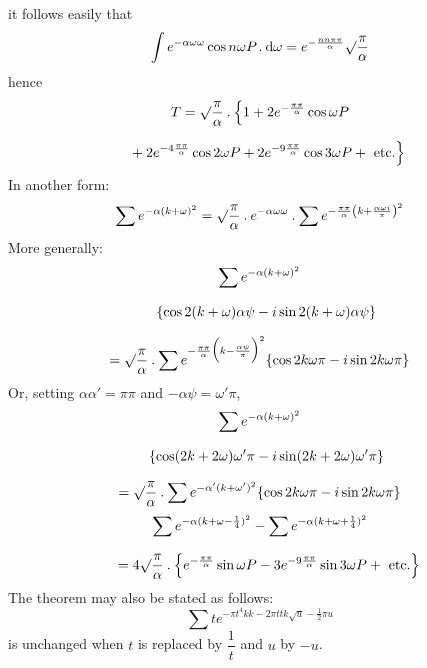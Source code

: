 it follows easily that
\[
\int e^{-\alpha\omega\omega}\cos n\omega P\mathbin{.}\mathrm{d}\omega
=e^{-\frac{nn\pi\pi}{\alpha}}\surd\frac{\pi}{\alpha}
\]
hence
\[
\begin{gathered}T=\surd\frac{\pi}{\alpha}\mathbin{.}
\Bigl\{1+2e^{-\frac{\pi\pi}{\alpha}}\cos\omega P
\\[7pt]\quad{}+2e^{-4\frac{\pi\pi}{\alpha}}\cos2\omega P
+2e^{-9\frac{\pi\pi}{\alpha}}\cos3\omega P+\text{ etc.}\Bigr\}\end{gathered}
\]
In another form:
\[
\sum e^{-\alpha(k+\omega)^2}
=\surd\frac{\pi}{\alpha}\mathbin{.}e^{-\alpha\omega\omega}\mathbin{.}
\sum e^{-\frac{\pi\pi}{\alpha}\left(k+\frac{\alpha\omega i}{\pi}\right)^2}
\]
More generally:
\[
\begin{gathered}
\sum e^{-\alpha(k+\omega)^2}\\[7pt]\quad{}\{\cos2(k+\omega)\alpha\psi-i\sin2(k+\omega)\alpha\psi\}\\[7pt]
=\surd\frac{\pi}{\alpha}\mathbin{.}
\sum e^{-\frac{\pi\pi}{\alpha}\Bigl(k-\frac{\alpha\psi}{\pi}\Bigr)^2}
\{\cos2k\omega\pi-i\sin2k\omega\pi\}
\end{gathered}
\]
Or, setting $\alpha\alpha'=\pi\pi$ and $-\alpha\psi=\omega'\pi$,
\[
\begin{gathered}
\sum e^{-\alpha(k+\omega)^2}\\[7pt]\quad{}\{\cos(2k+2\omega)\omega'\pi-i\sin(2k+2\omega)\omega'\pi\}\\[7pt]
=\surd\frac{\pi}{\alpha}\mathbin{.}\sum e^{-\alpha'(k+\omega')^2}
\{\cos2k\omega\pi-i\sin2k\omega\pi\}
\end{gathered}
\]
\[
\begin{gathered}\sum e^{-\alpha(k+\omega-\frac14)^2}-\sum e^{-\alpha(k+\omega+\frac14)^2}
\\[7pt]\quad{}=4\surd\frac{\pi}{\alpha}\mathbin{.}
\Bigl\{e^{-\frac{\pi\pi}{\alpha}}\sin\omega P
-3e^{-9\frac{\pi\pi}{\alpha}}\sin3\omega P+\text{ etc.}\Bigr\}\end{gathered}
\]
The theorem may also be stated as follows:
\[
\sum t e^{-\pi t^{4}kk-2\pi ttk\surd u-\frac12\pi u}
\]
is unchanged when $t$ is replaced by $\dfrac1t$ and $u$ by $-u$.
\clearpage
\endgroup
